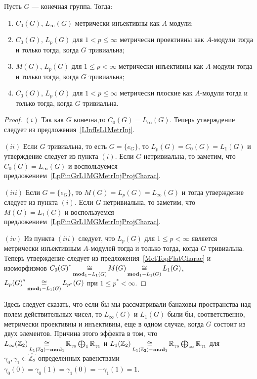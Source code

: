 \begin{proposition}\label{StdModFinGrL1MGMetrInjProjFlatCharac} Пусть $G$ ---
конечная группа. Тогда:

\begin{enumerate}[label = (\roman*)]
    \item $C_0(G)$, $L_\infty(G)$ метрически инъективны как $A$-модули;

    \item $C_0(G)$, $L_p(G)$ для $1<p\leq\infty$ метрически проективны как
    $A$-модули тогда и только тогда, когда $G$ тривиальна;

    \item $M(G)$, $L_p(G)$ для $1\leq p<\infty$ метрически инъективны как
    $A$-модули тогда и только тогда, когда $G$ тривиальна;

    \item $C_0(G)$, $L_p(G)$ для $1<p\leq\infty$ метрически 
    плоские как $A$-модули тогда и только тогда, когда $G$ тривиальна.
\end{enumerate}
\end{proposition}
\begin{proof}
$(i)$ Так как $G$ конечна,то $C_0(G)=L_\infty(G)$. Теперь утверждение следует из
предложения~\ref{LInfIsL1MetrInj}.

$(ii)$ Если $G$ тривиальна, то есть $G= \{e_G \}$, то $L_p(G)=C_0(G)=L_1(G)$ и
утверждение следует из пункта $(i)$. Если $G$ нетривиальна, то заметим, что
$C_0(G)=L_\infty(G)$ и воспользуемся
предложением~\ref{LpFinGrL1MGMetrInjProjCharac}.

$(iii)$ Если $G= \{e_G \}$, то $M(G)=L_p(G)=L_\infty(G)$ и тогда утверждение
следует из пункта $(i)$. Если $G$ нетривиальна, то заметим, что $M(G)=L_1(G)$ и
воспользуемся предложением~\ref{LpFinGrL1MGMetrInjProjCharac}.

$(iv)$ Из пункта $(iii)$ следует, что $L_p(G)$ для $1\leq p<\infty$ является
метрически инъективным $A$-модулей тогда и только тогда, когда $G$ тривиальна.
Теперь утверждение следует из предложения~\ref{MetTopFlatCharac} и изоморфизмов
${C_0(G)}^*\mathop{\mathbin{\cong}}\limits_{\mathbf{mod}_1-L_1(G)}M(G)\mathop{\mathbin{\cong}}\limits_{\mathbf{mod}_1-L_1(G)}L_1(G)$,
${L_p(G)}^*\mathop{\mathbin{\cong}}\limits_{\mathbf{mod}_1-L_1(G)}L_{p^*}(G)$ при $1\leq p^*<\infty$.
\end{proof}

Здесь следует сказать, что если бы мы рассматривали банаховы пространства над
полем действительных чисел, то $L_\infty(G)$ и $L_1(G)$ были бы, соответственно,
метрически проективны и инъективны, еще в одном случае, когда $G$ состоит из
двух элементов. Причина этого эффекта в том, что
$L_\infty(\mathbb{Z}_2)\mathop{\mathbin{\cong}}\limits_{L_1(\mathbb{Z}_2)-\mathbf{mod}_1}
\mathbb{R}_{\gamma_0}\bigoplus\nolimits_1\mathbb{R}_{\gamma_1}
$ и
$L_1(\mathbb{Z}_2)\mathop{\mathbin{\cong}}\limits_{L_1(\mathbb{Z}_2)-\mathbf{mod}_1}
\mathbb{R}_{\gamma_0}\bigoplus\nolimits_\infty\mathbb{R}_{\gamma_1}$
для $\gamma_0,\gamma_1\in\widehat{\mathbb{Z}_2}$ определенных равенствами
$\gamma_0(0)=\gamma_0(1)=\gamma_1(0)=-\gamma_1(1)=1$.

